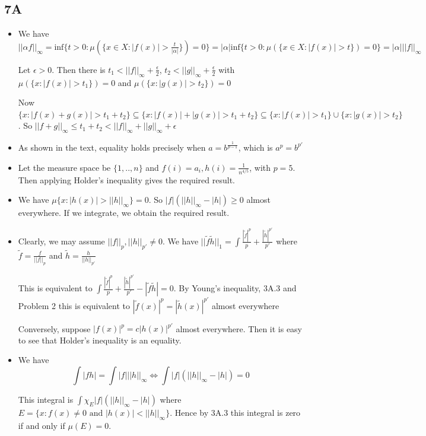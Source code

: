 \documentclass{article}
\begin{document}
\subsection*{7A}
\begin{itemize}
    \item [1] We have $||\alpha f||_\infty=\text{inf}\{t>0:\mu(\{x \in X:|f(x)|>\frac{t}{|\alpha|}\})=0\}=|\alpha|\text{inf}\{t>0:\mu(\{x \in X:|f(x)|>t\})=0\}=|\alpha|||f||_\infty$

    Let $\epsilon>0$. Then there is $t_1<||f||_\infty+\frac{\epsilon}{2}$, $t_2<||g||_\infty+\frac{\epsilon}{2}$ with $\mu(\{x:|f(x)|>t_1\})=0$ and $\mu(\{x:|g(x)|>t_2\})=0$

    Now $\{x:|f(x)+g(x)|>t_1+t_2\}\subseteq \{x:|f(x)|+|g(x)|>t_1+t_2\}\subseteq \{x:|f(x)|>t_1\}\cup\{x:|g(x)|>t_2\}$. So $||f+g||_\infty \leq t_1+t_2<||f||_\infty+||g||_\infty +\epsilon$

    \item[2] As shown in the text, equality holds precisely when $a=b^{\frac{1}{p-1}}$, which is $a^p=b^{p'}$ 

    \item[3] Let the measure space be $\{1,..,n\}$ and $f(i)=a_i,h(i)=\frac{1}{n^{4/5}}$, with $p=5$. Then applying Holder's inequality gives the required result.

    \item[4] We have $\mu\{x:|h(x)|>||h||_\infty\}=0$. So $|f|(||h||_\infty-|h|)\geq 0$ almost everywhere. If we integrate, we obtain the required result.

    \item[5] Clearly, we may assume $||f||_p,||h||_{p'}\neq0$. We have $||\tilde{f}\tilde{h}||_1=\int \frac{|\tilde{f}|^p}{p}+\frac{|\tilde{h}|^{p'}}{p'}$ where $\tilde{f}=\frac{f}{||f||_p}$ and $\tilde{h}=\frac{h}{||h||_{p'}}$

    This is equivalent to $\int \frac{|\tilde{f}|^p}{p}+\frac{|\tilde{h}|^{p'}}{p'}-|\tilde{f}\tilde{h}|=0$. By Young's inequality, 3A.3 and Problem 2 this is equivalent to $|\tilde{f}(x)|^p=|\tilde{h}(x)|^{p'}$ almost everywhere

    Conversely, suppose $|f(x)|^p=c|h(x)|^{p'}$ almost everywhere. Then it is easy to see that Holder's inequality is an equality.

    \item[6] We have \[\int|fh|=\int |f|||h||_\infty\iff \int |f|(||h||_\infty-|h|)=0 \]

    This integral is $\int \chi_E |f|(||h||_\infty-|h|)$ where $E=\{x:f(x)\neq 0 \text{ and }|h(x)|<||h||_\infty\}$. Hence by 3A.3 this integral is zero if and only if $\mu(E)=0$.


\end{itemize}
\end{document}
